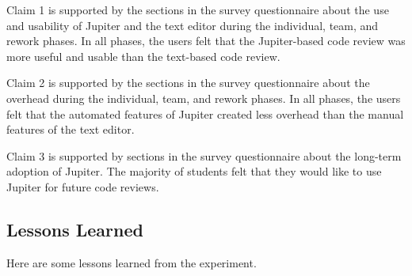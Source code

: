 Claim 1 is supported by the sections in the survey questionnaire about the use and usability of Jupiter and the text editor during the individual, team, and rework phases. In all phases, the users felt that the Jupiter-based code review was more useful and usable than the text-based code review.

Claim 2 is supported by the sections in the survey questionnaire about the overhead during the individual, team, and rework phases. In all phases, the users felt that the automated features of Jupiter created less overhead than the manual features of the text editor.

Claim 3 is supported by sections in the survey questionnaire about the long-term adoption of Jupiter. The majority of students felt that they would like to use Jupiter for future code reviews.

\subsection{Lessons Learned}
\label{subsec:lessons-learned}

Here are some lessons learned from the experiment.

